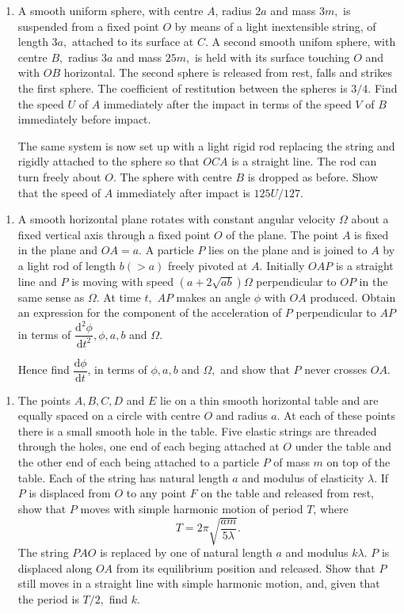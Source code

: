 \documentclass[a4, 11pt]{report}
\newlength{\qspace}
\newcounter{qnumber}
\newenvironment{question}%
 {\vspace{\qspace}
  \begin{enumerate}[\bfseries 1\quad][10]%
    \setcounter{enumi}{\value{qnumber}}%
    \item%
 }
{
  \end{enumerate}
  \filbreak
  \stepcounter{qnumber}
 }
\begin{document}
	
\begin{question}
A smooth uniform sphere, with centre $A$, radius $2a$ and mass $3m,$
is suspended from a fixed point $O$ by means of a light inextensible
string, of length $3a,$ attached to its surface at $C$. A second
smooth unifom sphere, with centre $B,$ radius $3a$ and mass $25m,$
is held with its surface touching $O$ and with $OB$ horizontal.
The second sphere is released from rest, falls and strikes the first
sphere. The coefficient of restitution between the spheres is $3/4.$
Find the speed $U$ of $A$ immediately after the impact in terms
of the speed $V$ of $B$ immediately before impact. 


The same system is now set up with a light rigid rod replacing the
string and rigidly attached to the sphere so that $OCA$ is a straight
line. The rod can turn freely about $O$. The sphere with centre $B$
is dropped as before. Show that the speed of $A$ immediately after
impact is $125U/127.$ 
	\end{question}
	
\begin{question}	
A smooth horizontal plane rotates with constant angular velocity $\Omega$
about a fixed vertical axis through a fixed point $O$ of the plane.
The point $A$ is fixed in the plane and $OA=a.$ A particle $P$
lies on the plane and is joined to $A$ by a light rod of length $b(>a)$
freely pivoted at $A$. Initially $OAP$ is a straight line and $P$
is moving with speed $(a+2\sqrt{ab})\Omega$ perpendicular to $OP$
in the same sense as $\Omega.$ At time $t,$ $AP$ makes an angle
$\phi$ with $OA$ produced. Obtain an expression for the component
of the acceleration of $P$ perpendicular to $AP$ in terms of $\dfrac{\mathrm{d}^{2}\phi}{\mathrm{d}t^{2}},\phi,a,b$
and \nolinebreak $\Omega.$


Hence find $\dfrac{\mathrm{d}\phi}{\mathrm{d}t}$, in terms of $\phi,a,b$
and $\Omega,$ and show that $P$ never crosses $OA.$
\end{question}


\begin{question}
The points $A,B,C,D$ and $E$ lie on a thin smooth horizontal table
and are equally spaced on a circle with centre $O$ and radius $a$.
At each of these points there is a small smooth hole in the table.
Five elastic strings are threaded through the holes, one end of each
beging attached at $O$ under the table and the other end of each
being attached to a particle $P$ of mass $m$ on top of the table.
Each of the string has natural length $a$ and modulus of elasticity
$\lambda.$ If $P$ is displaced from $O$ to any point $F$ on the
table and released from rest, show that $P$ moves with simple harmonic
motion of period $T$, where 
\[
T=2\pi\sqrt{\frac{am}{5\lambda}}.
\]
The string $PAO$ is replaced by one of natural length $a$ and modulus
$k\lambda.$ $P$ is displaced along $OA$ from its equilibrium position
and released. Show that $P$ still moves in a straight line with simple
harmonic motion, and, given that the period is $T/2,$ find $k$.
\end{question}
	
\end{document}
